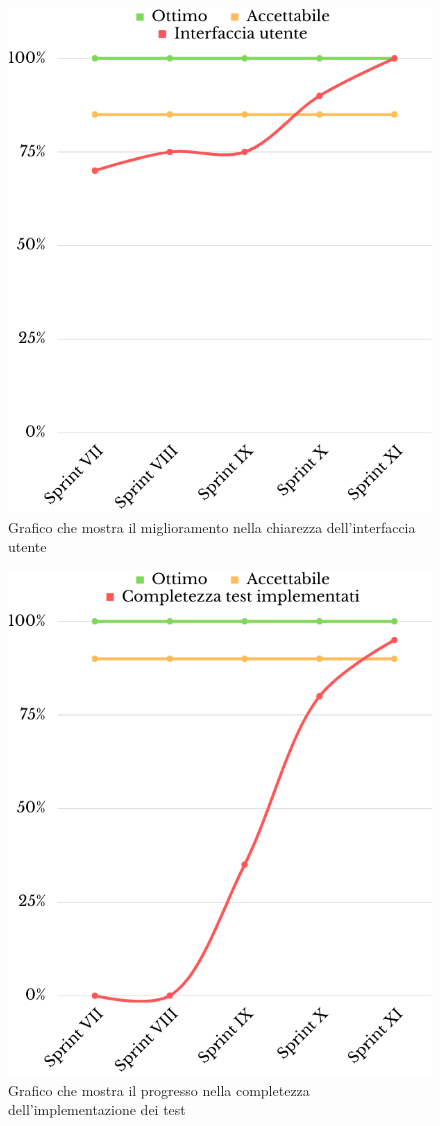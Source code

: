 \begin{figure}[H]
	\centering
	\includegraphics[scale=0.35]{img/interfaccia_utente.png}
	\caption{Grafico che mostra il miglioramento nella chiarezza dell'interfaccia utente}
\end{figure}
\begin{figure}[H]
	\centering
	\includegraphics[scale=0.35]{img/completezza_test.png}
	\caption{Grafico che mostra il progresso nella completezza dell'implementazione dei test}
\end{figure}
